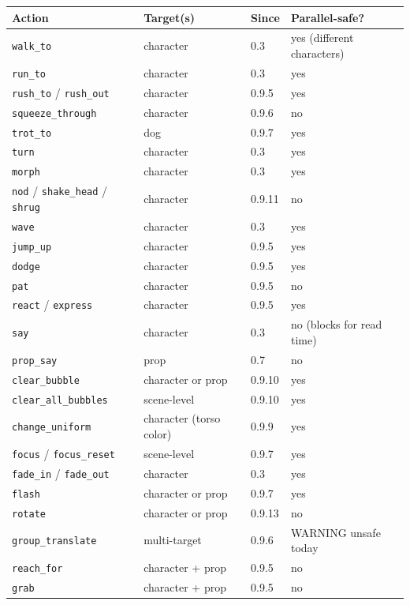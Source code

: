 \documentclass[
  12pt,
  letterpaper,
]{book}
\begin{document}
\begin{longtable}[]{@{}llll@{}}
\toprule\noalign{}
Action & Target(s) & Since & Parallel-safe? \\
\midrule\noalign{}
\endhead
\bottomrule\noalign{}
\endlastfoot
\texttt{walk\_to} & character & 0.3 & yes (different characters) \\
\texttt{run\_to} & character & 0.3 & yes \\
\texttt{rush\_to} / \texttt{rush\_out} & character & 0.9.5 & yes \\
\texttt{squeeze\_through} & character & 0.9.6 & no \\
\texttt{trot\_to} & dog & 0.9.7 & yes \\
\texttt{turn} & character & 0.3 & yes \\
\texttt{morph} & character & 0.3 & yes \\
\texttt{nod} / \texttt{shake\_head} / \texttt{shrug} & character &
0.9.11 & no \\
\texttt{wave} & character & 0.3 & yes \\
\texttt{jump\_up} & character & 0.9.5 & yes \\
\texttt{dodge} & character & 0.9.5 & yes \\
\texttt{pat} & character & 0.9.5 & no \\
\texttt{react} / \texttt{express} & character & 0.9.5 & yes \\
\texttt{say} & character & 0.3 & no (blocks for read time) \\
\texttt{prop\_say} & prop & 0.7 & no \\
\texttt{clear\_bubble} & character or prop & 0.9.10 & yes \\
\texttt{clear\_all\_bubbles} & scene-level & 0.9.10 & yes \\
\texttt{change\_uniform} & character (torso color) & 0.9.9 & yes \\
\texttt{focus} / \texttt{focus\_reset} & scene-level & 0.9.7 & yes \\
\texttt{fade\_in} / \texttt{fade\_out} & character & 0.3 & yes \\
\texttt{flash} & character or prop & 0.9.7 & yes \\
\texttt{rotate} & character or prop & 0.9.13 & no \\
\texttt{group\_translate} & multi-target & 0.9.6 & WARNING unsafe
today \\
\texttt{reach\_for} & character + prop & 0.9.5 & no \\
\texttt{grab} & character + prop & 0.9.5 & no \\

\end{longtable}
\end{document}
